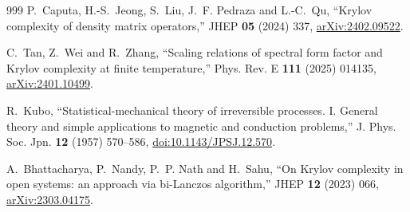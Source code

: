 \documentclass[a4paper,11pt]{article}
\theoremstyle{definition}
\theoremstyle{remark}
\begin{document}
\begin{thebibliography}{999}
P.~Caputa, H.-S.~Jeong, S.~Liu, J.~F. Pedraza and L.-C.~Qu,
``Krylov complexity of density matrix operators,''
JHEP \textbf{05} (2024) 337, \href{https://arxiv.org/abs/2402.09522}{arXiv:2402.09522}.

C.~Tan, Z.~Wei and R.~Zhang,
``Scaling relations of spectral form factor and Krylov complexity at finite temperature,''
Phys. Rev. E \textbf{111} (2025) 014135,
\href{https://arxiv.org/abs/2401.10499}{arXiv:2401.10499}.

R.~Kubo,
``Statistical-mechanical theory of irreversible processes. I. General theory and simple
applications to magnetic and conduction problems,''
J. Phys. Soc. Jpn. \textbf{12} (1957) 570--586,
\href{https://doi.org/10.1143/JPSJ.12.570}{doi:10.1143/JPSJ.12.570}.

A.~Bhattacharya, P.~Nandy, P.~P. Nath and H.~Sahu,
``On Krylov complexity in open systems: an approach via bi-Lanczos algorithm,''
JHEP \textbf{12} (2023) 066, \href{https://arxiv.org/abs/2303.04175}{arXiv:2303.04175}.
\end{thebibliography}
\end{document}
